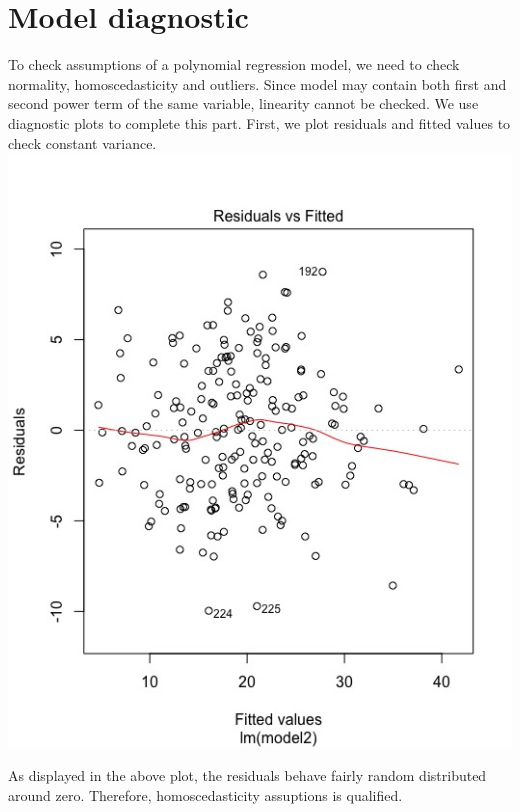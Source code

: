 \documentclass[letterpaper,10pt]{article}
\begin{document}
\section{Model diagnostic}
To check assumptions of a polynomial regression model, we need to check normality, homoscedasticity and outliers. Since model may contain both first and second power term of the same variable, linearity cannot be checked. We use diagnostic plots to complete this part.
First, we plot residuals and fitted values to check constant variance.
\includegraphics[scale=0.6]{ResidualVSFittedValues.jpeg}

As displayed in the above plot, the residuals behave fairly random distributed around zero. Therefore, homoscedasticity assuptions is qualified.
\end{document}
